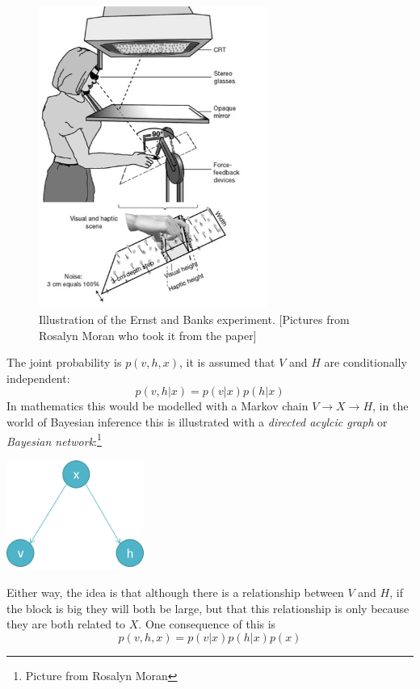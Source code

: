 \documentclass[12pt]{article}
\begin{document}
\begin{figure}[htb]
\begin{center}
\includegraphics[width=7.5cm]{fig_ernstbanks.png}
\end{center}
\caption{Illustration of the Ernst and Banks experiment. [Pictures
    from Rosalyn Moran who took it from the
    paper]\label{fig_ernstbanks}}
\end{figure}

The joint probability is $p(v,h,x)$, it is assumed that $V$ and $H$
are conditionally independent: 
\begin{equation}
p(v,h|x)=p(v|x)p(h|x)
\end{equation}
In mathematics this would be modelled with a Markov chain
$V\rightarrow X\rightarrow H$, in the world of Bayesian inference this
is illustrated with a \textsl{directed acylcic graph} or \textsl{Bayesian network}:\footnote{Picture from Rosalyn Moran}
\begin{center}
\includegraphics[width=4.5cm]{fig_dag.png}
\end{center}
Either way, the idea is that although there is a relationship between
$V$ and $H$, if the block is big they will both be large, but that
this relationship is only because they are both related to $X$. One consequence of this is
\begin{equation}
p(v,h,x)=p(v|x)p(h|x)p(x)
\end{equation}
\end{document}
